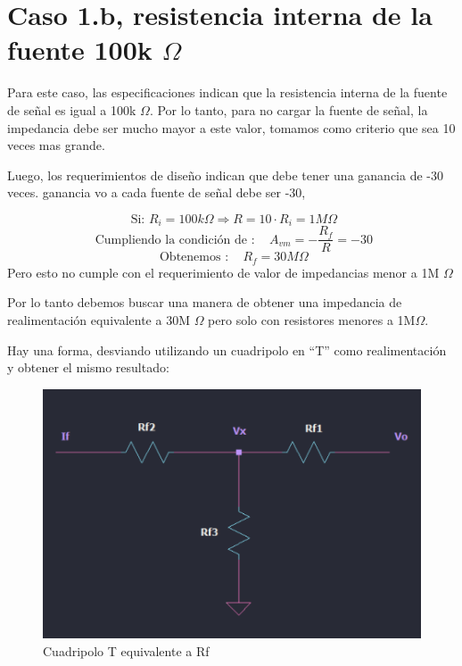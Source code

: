 \section{Caso 1.b, resistencia interna de la fuente 100k $\Omega$}

Para este caso, las especificaciones indican que la resistencia interna de la fuente de señal es igual a 100k $\Omega$. Por lo tanto, para no cargar la fuente de señal, la impedancia debe ser mucho mayor a este valor, tomamos como criterio que sea 10 veces mas grande.

Luego, los requerimientos de diseño indican que debe tener una ganancia de -30 veces. 
ganancia vo a cada fuente de señal debe ser -30, 

\[ \text { Si: } R_{i}=100k \Omega \Longrightarrow R=10 \cdot R_{i} = 1 M\Omega \]
\[ \text { Cumpliendo la condición de }: \quad A_{vm} =-\frac{R_{f}}{R}=-30 \]
\[ \text { Obtenemos }: \quad R_{f}=30 M\Omega \]
Pero esto no cumple con el requerimiento de valor de impedancias menor a 1M $\Omega$
\vspace{1em}

Por lo tanto debemos buscar una manera de obtener una impedancia de realimentación equivalente a 30M $\Omega$ pero solo con resistores menores a 1M$\Omega$.

Hay una forma, desviando utilizando un cuadripolo en ``T'' como realimentación y obtener el mismo resultado:


\begin{figure}[h!]
    \centering
    \includegraphics[width=1\linewidth]{img/cuadripoloT.png}
    \caption{Cuadripolo T equivalente a Rf}
    \label{fig:cuadripoloT}
\end{figure}

